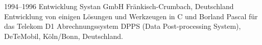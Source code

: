 \cventry
{1994--1996}
{Entwicklung}
{}
{Systan GmbH}
{Fränkisch-Crumbach, Deutschland}
{
  Entwicklung von einigen Lösungen und Werkzeugen in C und Borland Pascal für das
  Telekom D1 Abrechnungssystem DPPS (Data Post-processing System), DeTeMobil, Köln/Bonn, Deutschland.
}
